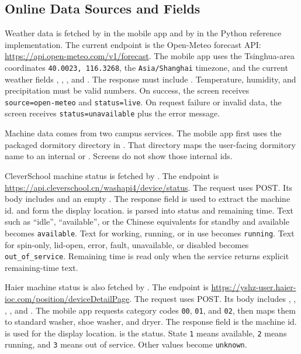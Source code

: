 \documentclass[11pt,a4paper]{article}
\begin{document}
\subsection{Online Data Sources and Fields}

Weather data is fetched by  in the mobile app and by  in the Python reference implementation. The current endpoint is the Open-Meteo forecast API: \url{https://api.open-meteo.com/v1/forecast}. The mobile app uses the Tsinghua-area coordinates \texttt{40.0023, 116.3268}, the \texttt{Asia/Shanghai} timezone, and the current weather fields , , , and . The response must include . Temperature, humidity, and precipitation must be valid numbers. On success, the screen receives \texttt{source=open-meteo} and \texttt{status=live}. On request failure or invalid data, the screen receives \texttt{status=unavailable} plus the error message.

Machine data comes from two campus services. The mobile app first uses the packaged dormitory directory in . That directory maps the user-facing dormitory name to an internal  or . Screens do not show those internal ids.

CleverSchool machine status is fetched by . The endpoint is \url{https://api.cleverschool.cn/washapi4/device/status}. The request uses POST. Its body includes  and an empty . The response field  is used to extract the machine id.  and  form the display location.  is parsed into status and remaining time. Text such as ``idle'', ``available'', or the Chinese equivalents for standby and available becomes \texttt{available}. Text for working, running, or in use becomes \texttt{running}. Text for spin-only, lid-open, error, fault, unavailable, or disabled becomes \texttt{out\_of\_service}. Remaining time is read only when the service returns explicit remaining-time text.

Haier machine status is also fetched by . The endpoint is \url{https://yshz-user.haier-ioc.com/position/deviceDetailPage}. The request uses POST. Its body includes , , , , and . The mobile app requests category codes \texttt{00}, \texttt{01}, and \texttt{02}, then maps them to standard washer, shoe washer, and dryer. The response field  is the machine id.  is used for the display location.  is the status. State \texttt{1} means available, \texttt{2} means running, and \texttt{3} means out of service. Other values become \texttt{unknown}.
\end{document}
